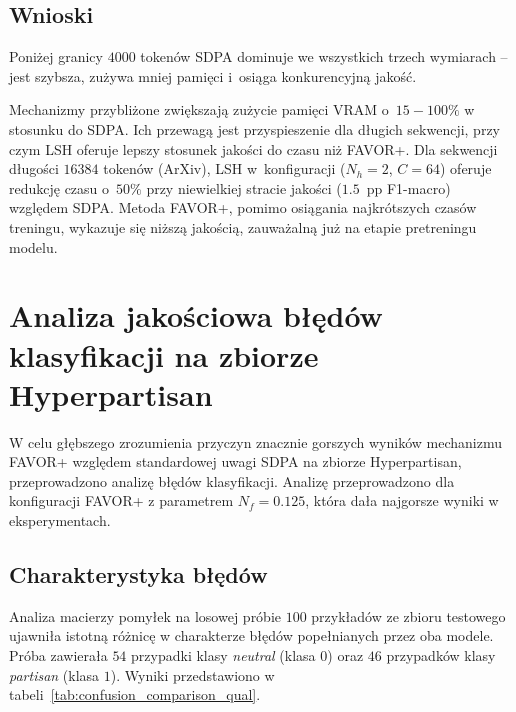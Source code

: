 \documentclass[a4paper,11pt,twoside]{report}
\theoremstyle{definition}
\begin{document}
\FloatBarrier


\subsection{Wnioski}
Poniżej granicy $4000$ tokenów SDPA dominuje we wszystkich trzech wymiarach -- jest szybsza, zużywa mniej pamięci i~osiąga konkurencyjną jakość. 

Mechanizmy przybliżone zwiększają zużycie pamięci VRAM o~$15-100\%$ w stosunku do SDPA. Ich przewagą jest przyspieszenie dla długich sekwencji, przy czym LSH oferuje lepszy stosunek jakości do czasu niż FAVOR+. Dla sekwencji długości $16384$ tokenów (ArXiv), LSH w~konfiguracji ($N_h{=}2$, $C{=}64$) oferuje redukcję czasu o~$50\%$ przy niewielkiej stracie jakości ($1.5$~pp F1-macro) względem SDPA. Metoda FAVOR+, pomimo osiągania najkrótszych czasów treningu, wykazuje się niższą jakością, zauważalną już na etapie pretreningu modelu.




















\section{Analiza jakościowa błędów klasyfikacji na zbiorze Hyperpartisan}

W celu głębszego zrozumienia przyczyn znacznie gorszych wyników mechanizmu  FAVOR+ względem standardowej uwagi SDPA na zbiorze Hyperpartisan, przeprowadzono analizę błędów klasyfikacji. Analizę przeprowadzono dla konfiguracji FAVOR+ z parametrem $N_f = 0.125$, która dała najgorsze wyniki w eksperymentach.

\subsection{Charakterystyka błędów}

Analiza macierzy pomyłek na losowej próbie $100$ przykładów ze zbioru testowego ujawniła istotną różnicę w charakterze błędów popełnianych przez oba modele. Próba zawierała $54$ przypadki klasy \textit{neutral} (klasa $0$) oraz $46$ przypadków klasy \textit{partisan} (klasa $1$). Wyniki przedstawiono w tabeli~\ref{tab:confusion_comparison_qual}.
\end{document}

